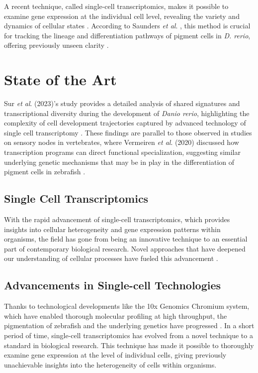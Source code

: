 \documentclass[runningheads]{llncs}
\begin{document}
A recent technique, called single-cell transcriptomics, makes it possible to examine gene expression at the individual cell level, revealing the variety and dynamics of cellular states \cite{nayak2021hitchhiker}. According to Saunders \textit{et al}. \cite{saunders2023embryo}, this method is crucial for tracking the lineage and differentiation pathways of pigment cells in \textit{D. rerio}, offering previously unseen clarity \cite{howard2021atlas}.

\section{State of the Art}
Sur \textit{et al}. (2023)'s study provides a detailed analysis of shared signatures and transcriptional diversity during the development of \textit{Danio rerio}, highlighting the complexity of cell development trajectories captured by advanced technology of single cell transcriptomy \cite{sur2023single}. These findings are parallel to those observed in studies on sensory nodes in vertebrates, where Vermeiren \textit{et al}. (2020) discussed how transcription programs can direct functional specialization, suggesting similar underlying genetic mechanisms that may be in play in the differentiation of pigment cells in zebrafish \cite{vermeiren2020vertebrate}.

\subsection{Single Cell Transcriptomics}
With the rapid advancement of single-cell transcriptomics, which provides insights into cellular heterogeneity and gene expression patterns within organisms, the field has gone from being an innovative technique to an essential part of contemporary biological research. Novel approaches that have deepened our understanding of cellular processes have fueled this advancement \cite{kulkarni2019beyond}.

\subsection{Advancements in Single-cell Technologies}
Thanks to technological developments like the 10x Genomics Chromium system, which have enabled thorough molecular profiling at high throughput, the pigmentation of zebrafish and the underlying genetics have progressed \cite{srivatsan2020massively}. In a short period of time, single-cell transcriptomics has evolved from a novel technique to a standard in biological research. This technique has made it possible to thoroughly examine gene expression at the level of individual cells, giving previously unachievable insights into the heterogeneity of cells within organisms. 
\end{document}
